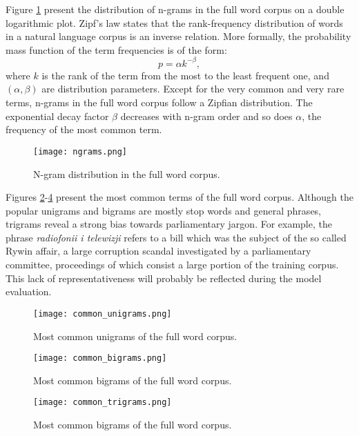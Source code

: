 Figure \ref{figure:ngramdistribution} present the distribution of n-grams in the full word corpus on a double logarithmic plot. Zipf's law states that the rank-frequency distribution of words in a natural language corpus is an inverse relation. More formally, the probability mass function of the term frequencies is of the form:
\begin{equation}
	p=\alpha k^{-\beta},
	\label{equation:zipf}
\end{equation}
where $k$ is the rank of the term from the most to the least frequent one, and $(\alpha, \beta)$ are distribution parameters. Except for the very common and very rare terms, n-grams in the full word corpus follow a Zipfian distribution. The exponential decay factor $\beta$ decreases with n-gram order and so does $\alpha$, the frequency of the most common term.

\begin{figure}[!htbp]
	  \centering
	  \texttt{[image: ngrams.png]}
      \caption{N-gram distribution in the full word corpus.}
      \label{figure:ngramdistribution}
\end{figure}

Figures \ref{figure:commonunigrams}-\ref{figure:commontrigrams} present the most common terms of the full word corpus. Although the popular unigrams and bigrams are mostly stop words and general phrases, trigrams reveal a strong bias towards parliamentary jargon. For example, the phrase \textit{radiofonii i telewizji} refers to a bill which was the subject of the so called Rywin affair, a large corruption scandal investigated by a parliamentary committee, proceedings of which consist a large portion of the training corpus. This lack of representativeness will probably be reflected during the model evaluation.

\begin{figure}[!htbp]
	  \centering
	  \texttt{[image: common\_unigrams.png]}
	      \caption{Most common unigrams of the full word corpus.}
	      \label{figure:commonunigrams}
\end{figure}

\begin{figure}[!htbp]
	  \centering
	  \texttt{[image: common\_bigrams.png]}
	      \caption{Most common bigrams of the full word corpus.}
	      \label{figure:commonbigrams}
\end{figure}

\begin{figure}[!htbp]
	  \centering
	  \texttt{[image: common\_trigrams.png]}
	      \caption{Most common bigrams of the full word corpus.}
	      \label{figure:commontrigrams}
\end{figure}

